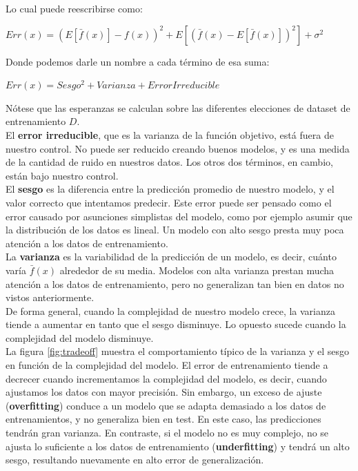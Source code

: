 Lo cual puede reescribirse como:

\begin{center}
$Err(x) = (E[\bar{f}(x)]-f(x))^2 + E[(\bar{f}(x)-E[\bar{f}(x)])^2] + \sigma^2$ 
\end{center}

Donde podemos darle un nombre a cada término de esa suma:

\begin{center}
$Err(x) =  Sesgo^2 + Varianza + Error Irreducible$
\end{center}

Nótese que las esperanzas se calculan sobre las diferentes elecciones de dataset de entrenamiento $D$. \\

El \textbf{error irreducible}, que es la varianza de la función objetivo, está fuera de nuestro control. No puede ser reducido creando buenos modelos, y es una medida de la cantidad de ruido en nuestros datos. Los otros dos términos, en cambio, están bajo nuestro control.\\

El \textbf{sesgo} es la diferencia entre la predicción promedio de nuestro modelo, y el valor correcto que intentamos predecir. Este error puede ser pensado como el error causado por asunciones simplistas del modelo, como por ejemplo asumir que la distribución de los datos es lineal. Un modelo con alto sesgo presta muy poca atención a los datos de entrenamiento. \\

La \textbf{varianza} es la variabilidad de la predicción de un modelo, es decir, cuánto varía $\bar{f}(x)$ alrededor de su media. Modelos con alta varianza prestan mucha atención a los datos de entrenamiento, pero no generalizan tan bien en datos no vistos anteriormente. \\

De forma general, cuando la complejidad de nuestro modelo crece, la varianza tiende a aumentar en tanto que el sesgo disminuye. Lo opuesto sucede cuando la complejidad del modelo disminuye. \\

La figura \ref{fig:tradeoff} muestra el comportamiento típico de la varianza y el sesgo en función de la complejidad del modelo. El error de entrenamiento tiende a decrecer cuando incrementamos la complejidad del modelo, es decir, cuando ajustamos los datos con mayor precisión. Sin embargo, un exceso de ajuste (\textbf{overfitting}) conduce a un modelo que se adapta demasiado a los datos de entrenamientos, y no generaliza bien en test. En este caso, las predicciones tendrán gran varianza. En contraste, si el modelo no es muy complejo, no se ajusta lo suficiente a los datos de entrenamiento (\textbf{underfitting}) y tendrá un alto sesgo, resultando nuevamente en alto error de generalización.\\ 


